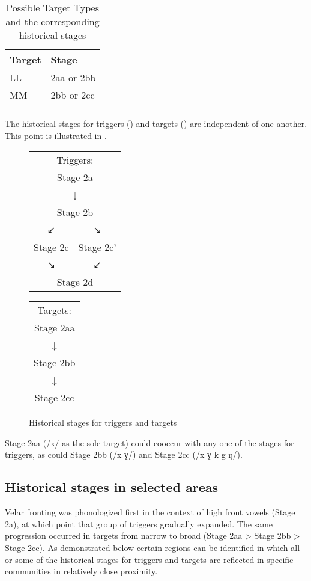 \begin{table}
\caption{Possible Target Types and the corresponding historical stages\label{tab:12.26}}
\begin{tabular}{ll}
\lsptoprule
Target & Stage\\\midrule
LL & 2aa or 2bb\\
MM & 2bb or 2cc\\
\lspbottomrule
\end{tabular}
\end{table}

The historical stages for triggers () and targets () are independent of one another. This point is illustrated in .

\begin{figure}[H]
\hfill\begin{tabular}[t]{cc}
\multicolumn{2}{c}{Triggers:}\\
\multicolumn{2}{c}{Stage 2a} \\ 
 \multicolumn{2}{c}{↓}       \\  
\multicolumn{2}{c}{Stage 2b} \\  
     ↙      &    ↘           \\  
  Stage 2c & Stage 2c'       \\  
  ↘      &    ↙ \\
\multicolumn{2}{c}{Stage 2d}
\end{tabular}\hfill\begin{tabular}[t]{c}
 Targets:\\
Stage 2aa\\
 ↓ \\
Stage 2bb\\
 ↓ \\
Stage 2cc\\
 \end{tabular}\hfill\hbox{}
\caption{Historical stages for triggers and targets\label{fig:12:1}}
\end{figure}

Stage 2aa (/x/ as the sole target) could cooccur with any one of the stages for triggers, as could Stage 2bb (/x ɣ/) and Stage 2cc (/x ɣ k g ŋ/).

\subsection{Historical stages in selected areas}\label{sec:12.5.2}

Velar fronting was phonologized first in the context of high front vowels (Stage 2a), at which point that group of triggers gradually expanded. The same progression occurred in targets from narrow to broad (Stage 2aa > Stage 2bb > Stage 2cc). As demonstrated below certain regions can be identified in which all or some of the historical stages for triggers and targets are reflected in specific communities in relatively close proximity.

